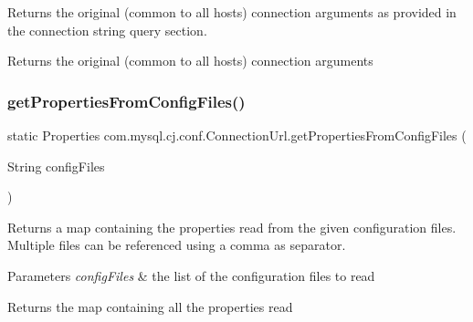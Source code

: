 Returns the original (common to all hosts) connection arguments as provided in the connection string query section.

\begin{DoxyReturn}{Returns}
the original (common to all hosts) connection arguments 
\end{DoxyReturn}
\mbox{\label{classcom_1_1mysql_1_1cj_1_1conf_1_1_connection_url_ab0b909200aa45ca290930add14c8924e}} 
\subsubsection{\texorpdfstring{get\+Properties\+From\+Config\+Files()}{getPropertiesFromConfigFiles()}}
{\footnotesize\ttfamily static Properties com.\+mysql.\+cj.\+conf.\+Connection\+Url.\+get\+Properties\+From\+Config\+Files (\begin{DoxyParamCaption}\item[{String}]{config\+Files }\end{DoxyParamCaption})\hspace{0.3cm}{\ttfamily [static]}}

Returns a map containing the properties read from the given configuration files. Multiple files can be referenced using a comma as separator.


\begin{DoxyParams}{Parameters}
{\em config\+Files} & the list of the configuration files to read \\
\hline
\end{DoxyParams}
\begin{DoxyReturn}{Returns}
the map containing all the properties read 
\end{DoxyReturn}
\mbox{\label{classcom_1_1mysql_1_1cj_1_1conf_1_1_connection_url_af2928b801cd9b2eaf89e94b3b123e357}} 

